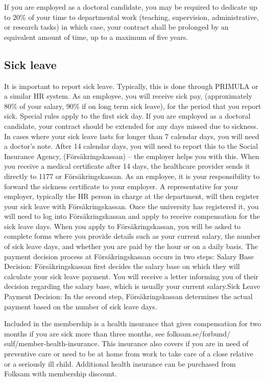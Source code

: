 \documentclass{article}
\begin{document}
If you are employed as a doctoral candidate, you may be required to dedicate
up to 20\% of your time to departmental work (teaching, supervision, administrative, or research tasks) in which case, your contract shall be prolonged by an equivalent amount of time, up to a maximum of five years.

\subsection{Sick leave}
It is important to report sick leave. Typically, this is done through PRIMULA or a similar HR system. As an employee, you will receive sick pay, (approximately 80\% of your salary, 90\% if on long
term sick leave), for the period that you report sick. Special rules apply to the first sick day.  If you are employed as a doctoral candidate, your contract should be extended for any days missed
due to sickness. In cases where your sick leave lasts for longer than 7 calendar days, you will need a doctor’s note. After 14 calendar days, you will need to report this to the Social Insurance
Agency, (Försäkringskassan) – the employer helps you with this. When you receive a medical certificate after 14 days, the healthcare provider sends it directly to 1177 or Försäkringskassan. As an employee, it is your responsibility to forward the sickness certificate to your employer. A representative for your employer, typically the HR person in charge at the department, will then register your sick leave with Försäkringskassan. Once the university has registered it, you will need to log into Försäkringskassan and apply to receive compensation for the sick leave days. When you apply to Försäkringskassan, you will be asked to complete forms where you provide details such as your current salary, the number of sick leave days, and whether you are paid by the hour or on a daily basis. The payment decision process at Försäkringskassan occurs in two steps: Salary Base Decision: Försäkringskassan first decides the salary base on which they will calculate your sick leave payment. You will receive a letter informing you of their decision regarding the salary base, which is usually your current salary.Sick Leave Payment Decision: In the second step, Försäkringskassan determines the actual payment based on the number of sick leave days.

Included in the membership is a health insurance that gives compensation for two months if you are sick more than three months, see folksam.se/forbund/
sulf/member-health-insurance. This insurance also covers if you are in need of preventive care or need to be at home from work to take care of a close relative or a seriously ill child. Additional
health insurance can be purchased from Folksam with membership discount.
\end{document}
